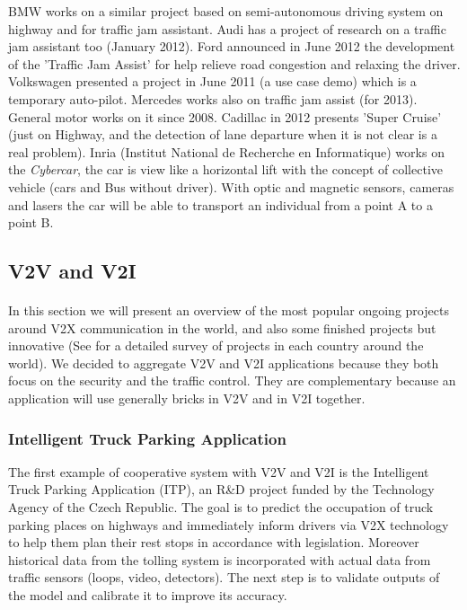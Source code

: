 \documentclass[a4paper]{article}
\begin{document}
BMW \cite{BMWTrafficJamAssist} works on a similar project based on semi-autonomous driving system on highway and for traffic jam assistant. Audi \cite{AudiTrafficJamAssist} has a project of research on a traffic jam assistant too (January 2012). Ford \cite{FordTrafficJamAssist} announced in June 2012 the development of the 'Traffic Jam Assist' for help relieve road congestion and relaxing the driver. Volkswagen \cite{VolkswagenTrafficJamAssist} presented a project in June 2011 (a use case demo) which is a temporary auto-pilot. Mercedes works also on traffic jam assist (for 2013). General motor \cite{GMTrafficJamAssist} works on it since 2008. Cadillac \cite{CadillacTrafficJamAssist} in 2012 presents 'Super Cruise' (just on Highway, and the detection of lane departure when it is not clear is a real problem). Inria (Institut National de Recherche en Informatique) works on the \textit{Cybercar}, the car is view like a horizontal lift with the concept of collective vehicle (cars and Bus without driver). With optic and magnetic sensors, cameras and lasers the car will be able to transport an individual from a point A to a point B.

\subsection{V2V and V2I}
\paragraph{}In this section we will present an overview of the most popular ongoing projects around V2X communication in the world, and also some finished projects but innovative (See \cite{Planning2012} for a detailed survey of projects in each country around the world). We decided to aggregate V2V and V2I applications because they both focus on the security and the traffic control. They are complementary because an application will use generally bricks in V2V and in V2I together.

\subsubsection{Intelligent Truck Parking Application}

The first example of cooperative system with V2V and V2I is the Intelligent Truck Parking Application (ITP), an R\&D project funded by the Technology Agency of the Czech Republic. The goal is to predict the occupation of truck parking places on highways and immediately inform drivers via V2X technology to help them plan their rest stops in accordance with legislation. Moreover historical data from the tolling system is incorporated with actual data from traffic sensors (loops, video, detectors). The next step is to validate outputs of the model and calibrate it to improve its accuracy.
\end{document}
